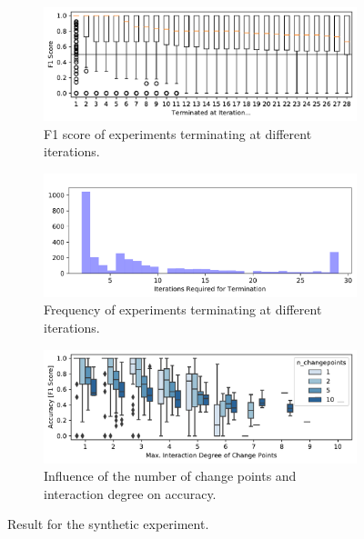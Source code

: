 \documentclass[sigconf, screen]{acmart}
\begin{document}
	\begin{figure}
		\begin{subfigure}{\linewidth}
			\centering
			\includegraphics[width=\linewidth]{images/accuracy_after_termination.pdf}
			\vspace{-5mm}
			\caption{F1 score of experiments terminating at different iterations.}	
			\label{fig:results_rq1_accuracy_terminated}
		\end{subfigure}
		\begin{subfigure}{\linewidth}
			\centering
			\vspace{1mm}
			\includegraphics[width=\linewidth]{images/iterations_for_termination.pdf}
			\vspace{-5mm}
			\caption{Frequency of experiments terminating at different iterations.}	
			\label{fig:results_rq1_frequency}
		\end{subfigure}
		\begin{subfigure}{\linewidth}
			\vspace{4mm}
			\centering
			\includegraphics[width=\linewidth]{images/max_degree_after_termination}
			\caption{Influence of the number of change points and interaction degree on accuracy.}	
			\label{fig:results_rq1_degree}
		\end{subfigure}
		\caption{Result for the synthetic experiment.}
		\label{fig:results_rq1:results_rq1_degree}
	\end{figure} 	
\end{document}
